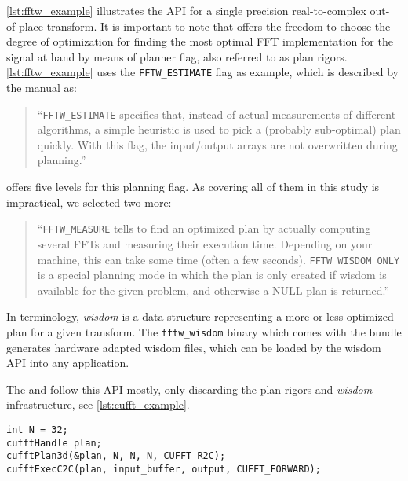 \cref{lst:fftw_example} illustrates the \fftw{} API for a single precision real-to-complex out-of-place transform. It is important to note that \fftw{} offers the freedom to choose the degree of optimization for finding the most optimal FFT implementation for the signal at hand by means of planner flag, also referred to as plan rigors. \cref{lst:fftw_example} uses the \texttt{FFTW\_ESTIMATE} flag as example, which is described by the \fftw{} manual \cite{fftw_manual} as:
%
\begin{quote}
``\texttt{FFTW\_ESTIMATE} specifies that, instead of actual measurements of different algorithms, a simple heuristic is used to pick a (probably sub-optimal) plan quickly. With this flag, the input/output arrays are not overwritten during planning.''
\end{quote}
%
\fftw{} offers five levels for this planning flag. As covering all of them in this study is impractical, we selected two more:
\begin{quote}
``\texttt{FFTW\_MEASURE} tells \fftw{} to find an optimized plan by actually computing several FFTs and measuring their execution time. Depending on your machine, this can take some time (often a few seconds).\newline
\texttt{FFTW\_WISDOM\_ONLY} is a special planning mode in which the plan is only created if wisdom is available for the given problem, and otherwise a NULL plan is returned.''
\end{quote}
%
In \fftw{} terminology, \emph{wisdom} is a data structure representing a more or less optimized plan for a given transform. The \texttt{fftw\_wisdom} binary which comes with the \fftw{} bundle generates hardware adapted wisdom files, which can be loaded by the wisdom API into any \fftw{} application.

The \cufft{} and \clfft{} follow this API mostly, only discarding the plan rigors and \emph{wisdom} infrastructure, see \cref{lst:cufft_example}.

\begin{lstlisting}[caption={Minimal usage example of the \cufft{} single precision real-to-complex planner API. Memory management is omitted.},label={lst:cufft_example}]
int N = 32;
cufftHandle plan;
cufftPlan3d(&plan, N, N, N, CUFFT_R2C);
cufftExecC2C(plan, input_buffer, output, CUFFT_FORWARD);
\end{lstlisting}
%
